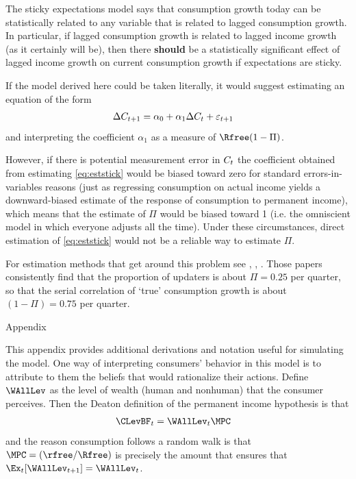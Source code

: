 \documentclass{handout}
\begin{document}
The sticky expectations model says that consumption growth today 
can be statistically related to any variable that is related to lagged 
consumption growth.  In particular, if lagged consumption growth is 
related to lagged income growth (as it certainly will be), then there 
{\bf should} be a statistically significant effect of lagged income 
growth on current consumption growth if expectations are sticky.

If the model derived here could be taken literally, it would suggest estimating
an equation of the form
\begin{equation}\begin{gathered}\begin{aligned}
        \Delta C_{t+1} & =  \alpha_{0}+\alpha_{1} \Delta C_{t} + \varepsilon_{t+1} \label{eq:eststick}
\end{aligned}\end{gathered}\end{equation}
and interpreting the coefficient $\alpha_{1}$ as a measure of 
$\Rfree (1-\Pi)$.

 


However, if there is potential measurement error in $C_{t}$ the
coefficient obtained from estimating \eqref{eq:eststick} would be
biased toward zero for standard errors-in-variables reasons (just as
regressing consumption on actual income yields a downward-biased
estimate of the response of consumption to permanent income), which
means that the estimate of $\Pi$ would be biased toward 1 (i.e. the
omniscient model in which everyone adjusts all the time).  Under these
circumstances, direct estimation of \eqref{eq:eststick} would not be a
reliable way to estimate $\Pi$.

For estimation methods that get around this problem see \cite{som07}, \cite{cssIntlStickyC}, \cite{cosHousingWealth}.  Those papers consistently find that the proportion of updaters is about $\Pi=0.25$ per quarter, so that the serial correlation of `true' consumption growth is about $(1-\Pi)=0.75$ per quarter.



\pagebreak\vfill\eject
\appendix


\centerline{\Large Appendix}\medskip\medskip

This appendix provides additional derivations and notation useful for simulating the model.  
One way of interpreting consumers' behavior in this model is to attribute to them the beliefs
that would rationalize their actions.  Define $\WAllLev$ as the level of wealth (human and nonhuman)
that the consumer perceives.  Then the Deaton definition of the permanent income hypothesis is that 
\begin{equation}\begin{gathered}\begin{aligned}
  \CLevBF_{t} & =  \WAllLev_{t} \MPC
\end{aligned}\end{gathered}\end{equation}
and the reason consumption follows a random walk is that $\MPC=(\rfree/\Rfree)$ is precisely the amount
that ensures that $\Ex_{t}[\WAllLev_{t+1}] = \WAllLev_{t}$.
\end{document}
